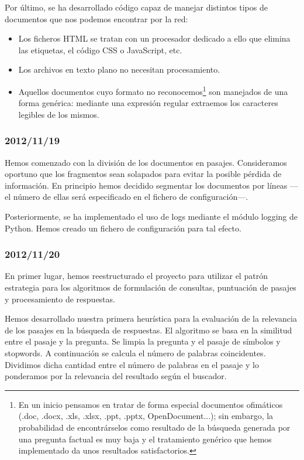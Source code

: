 \documentclass[12pt,a4paper,titlepage]{article}
\begin{document}
Por último, se ha desarrollado código capaz de manejar distintos tipos de documentos que nos podemos encontrar por la red:
\begin{itemize}
\item Los ficheros HTML se tratan con un procesador dedicado a ello que elimina las etiquetas, el código CSS o JavaScript, etc.
\item Los archivos en texto plano no necesitan procesamiento.
\item Aquellos documentos cuyo formato no reconocemos\footnote{En un inicio pensamos en tratar de forma especial documentos ofimáticos (.doc, .docx, .xls, .xlsx, .ppt, .pptx, OpenDocument...); sin embargo, la probabilidad de encontrárselos como resultado de la búsqueda generada por una pregunta factual es muy baja y el tratamiento genérico que hemos implementado da unos resultados satisfactorios.} son manejados de una forma genérica: mediante una expresión regular extraemos los caracteres legibles de los mismos.
\end{itemize}

\subsubsection*{2012/11/19}
Hemos comenzado con la división de los documentos en pasajes. Consideramos oportuno que los fragmentos sean solapados para evitar la posible pérdida de información. En principio hemos decidido segmentar los documentos por líneas ---el número de ellas será especificado en el fichero de configuración---.

Posteriormente, se ha implementado el uso de logs mediante el módulo logging de Python. Hemos creado un fichero de configuración para tal efecto.

\subsubsection*{2012/11/20}
En primer lugar, hemos reestructurado el proyecto para utilizar el patrón estrategia para los algoritmos de formulación de consultas, puntuación de pasajes y procesamiento de respuestas.

Hemos desarrollado nuestra primera heurística para la evaluación de la relevancia de los pasajes en la búsqueda de respuestas. El algoritmo se basa en la similitud entre el pasaje y la pregunta. Se limpia la pregunta y el pasaje de símbolos y stopwords. A continuación se calcula el número de palabras coincidentes. Dividimos dicha cantidad entre el número de palabras en el pasaje y lo ponderamos por la relevancia del resultado según el buscador.
\end{document}
